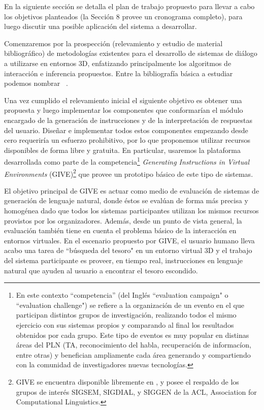 En la siguiente secci\'on se detalla el plan de trabajo propuesto para llevar a cabo los objetivos planteados (la Secci\'on 8
provee un cronograma completo), para luego discutir una posible aplicaci\'on del sistema a desarrollar.


Comenzaremos por la prospecci\'on (relevamiento y estudio de material bibliogr\'afico)
de metodolo\-g\'ias existentes para el desarrollo de sistemas de di\'alogo a utilizarse en entornos 3D, enfatizando principalmente los algoritmos de interacci\'on e inferencia propuestos. Entre la bibliograf\'ia b\'asica a estudiar podemos nombrar ~\citep{}.

Una vez cumplido el relevamiento inicial el siguiente objetivo es
obtener una propuesta y luego implementar los componentes que
conformar\'ian el m\'odulo encargado de la generaci\'on de instrucciones
y de la interpretaci\'on de respuestas del usuario.
Dise\~nar e implementar todos estos componentes empezando desde cero requerir\'ia un esfuerzo prohibitivo, por lo que proponemos utilizar recursos disponibles de forma libre y gratuita. En particular, usaremos la plataforma desarrollada como parte de la competencia\footnote{En este contexto ``competencia'' (del Ingl\'es ``evaluation campaign" o ``evaluation challenge") se refiere a la organizaci\'on de un evento en el que participan distintos grupos de investigaci\'on, realizando todos el mismo ejercicio con sus sistemas propios y comparando al final los resultados obtenidos por cada grupo. Este tipo de eventos es muy popular en distinas \'areas del PLN (TA, reconocimiento del habla, recuperaci\'on de informac\'ion, entre otras) y benefician ampliamente cada \'area generando y compartiendo con la comunidad de investigadores nuevas tecnolog\'ias.} \textit{Generating Instructions in Virtual Environments} (GIVE)\footnote{GIVE se encuentra disponible libremente en  , y posee el respaldo de los grupos de inter\'es SIGSEM, SIGDIAL, y SIGGEN de la ACL, Association for Computational Linguistics.} que
provee un prototipo b\'asico de este tipo de sistemas.

El objetivo principal de GIVE es actuar como medio de evaluaci\'on de sistemas de generaci\'on
de lenguaje natural, donde \'estos se eval\'uan de forma m\'as precisa y homog\'enea dado que todos los sistemas participantes utilizan los mismos recursos provistos por los organizadores. Adem\'as, desde un punto de vista general, la evaluaci\'on
tambi\'en tiene en cuenta el problema b\'asico de la interacci\'on en
entornos virtuales.  En el escenario propuesto por GIVE, el usuario
humano lleva acabo una tarea de ``b\'usqueda del tesoro" en un entorno
virtual 3D y el trabajo del sistema participante es proveer, en tiempo
real, instrucciones en lenguaje natural que ayuden al usuario
a encontrar el tesoro escondido.

